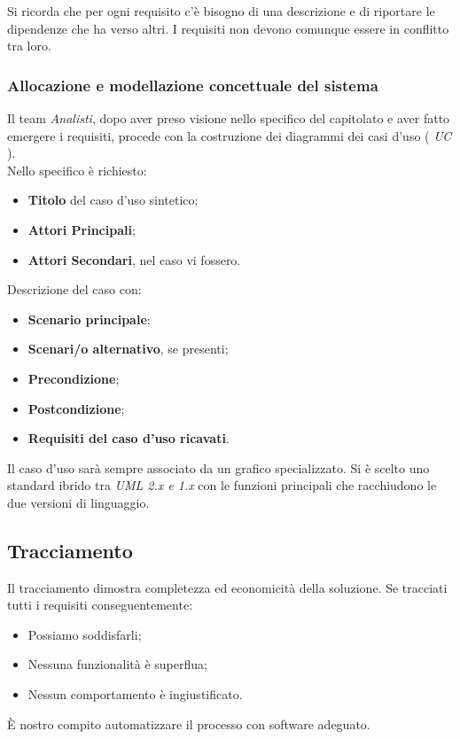 \documentclass[12pt,a4paper,titlepage]{article}
\begin{document}
Si ricorda che per ogni requisito c'è bisogno di una descrizione e di riportare le dipendenze che ha verso altri. I requisiti non devono comunque essere in conflitto tra loro.

\subsubsection{Allocazione e modellazione concettuale del sistema}
Il team \textit{Analisti}, dopo aver preso visione nello specifico del capitolato e aver fatto emergere i requisiti, procede con la costruzione dei diagrammi dei casi d'uso ( \textit{UC} ).\\
Nello specifico è richiesto:
\begin{itemize}
	\item \textbf{Titolo} del caso d'uso sintetico;
	\item \textbf{Attori Principali};
	\item \textbf{Attori Secondari}, nel caso vi fossero.
\end{itemize}

Descrizione del caso con:
\begin{itemize}
	\item \textbf{Scenario principale};
	\item \textbf{Scenari/o alternativo}, se presenti;
	\item \textbf{Precondizione};
	\item \textbf{Postcondizione};
	\item \textbf{Requisiti del caso d'uso ricavati}.
\end{itemize}
Il caso d'uso sarà sempre associato da un grafico specializzato. Si è scelto uno standard ibrido tra \textit{UML 2.x e 1.x} con le funzioni principali che racchiudono le due versioni di linguaggio.

\subsection{Tracciamento}
Il tracciamento dimostra completezza ed economicità della soluzione. Se tracciati tutti i requisiti conseguentemente:
\begin{itemize}
	\item Possiamo soddisfarli;
	\item Nessuna funzionalità è superflua;
	\item Nessun comportamento è ingiustificato.
\end{itemize}
È nostro compito automatizzare il processo con software adeguato.
\end{document}
